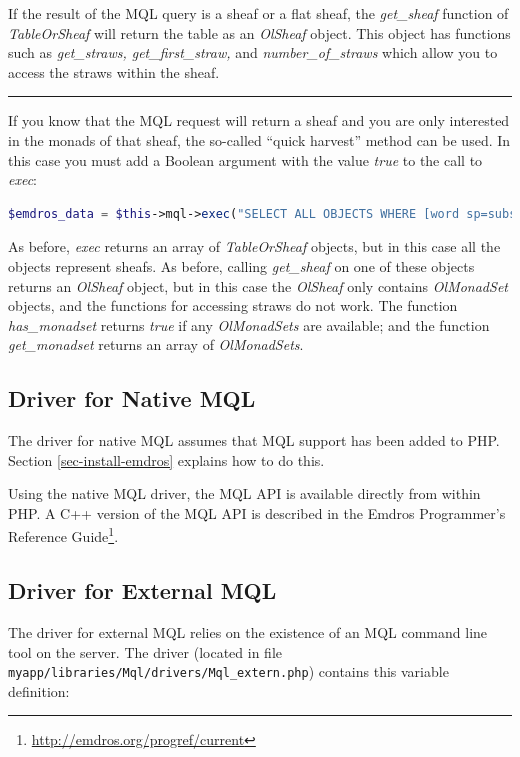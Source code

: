 \documentclass[11pt,oneside,a4paper]{memoir}
\begin{document}
If the result of the MQL query is a sheaf or a flat sheaf, the \emph{get\_sheaf} function of
\emph{TableOrSheaf} will return the table as an \emph{OlSheaf} object. This object has functions
such as \emph{get\_straws, get\_first\_straw,} and \emph{number\_of\_straws} which allow you to
access the straws within the sheaf.

\pfbreak

If you know that the MQL request will return a sheaf and you are only interested in the monads of
that sheaf, the so-called ``quick harvest'' method can be used. In
this case you must add a Boolean argument with the value \emph{true} to the call to \emph{exec}:

\begin{lstlisting}[language=PHP]
$emdros_data = $this->mql->exec("SELECT ALL OBJECTS WHERE [word sp=subs] GOqxqxqx", true);
\end{lstlisting}

As before, \emph{exec} returns an array of \emph{TableOrSheaf} objects, but in this case all the
objects represent sheafs. As before, calling \emph{get\_sheaf} on one of these objects returns an
\emph{OlSheaf} object, but in this case the \emph{OlSheaf} only contains \emph{OlMonadSet} objects, and the
functions for accessing straws do not work. The function \emph{has\_monadset} returns \emph{true} if
any \emph{OlMonadSets} are available; and the function \emph{get\_monadset} returns an array of
\emph{OlMonadSets}.

\subsection{Driver for Native MQL}\label{sec-mql-native}

The driver for native MQL assumes that MQL support has been added to PHP. Section
\ref{sec-install-emdros} explains how to do this.

Using the native MQL driver, the MQL API is available directly from within PHP. A C++ version of the
MQL API is described in the Emdros Programmer's Reference
Guide\footnote{\url{http://emdros.org/progref/current}}.

\subsection{Driver for External MQL}\label{sec-mql-extern}

The driver for external MQL relies on the existence of an MQL command line tool on the server. The
driver (located in file \texttt{myapp/libraries/Mql/drivers/Mql\_extern.php}) contains this variable
definition:
\end{document}
